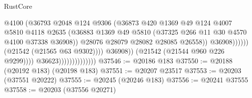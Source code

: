 \begin{lexlean}{RustCore}
\begin{coremodule}
                                                        @4100
                                                        (@36793
                                                          @2048
                                                          @124
                                                          @9306
                                                          (@36873
                                                            @420
                                                            @1369
                                                            @49
                                                            @124
                                                            @4007
                                                            @5810
                                                            @4118
                                                            @2635
                                                            (@36883
                                                              @1369
                                                              @49
                                                              @5810
                                                              (@37325
                                                                @266
                                                                @11
                                                                @30
                                                                @4570
                                                                @4100
                                                                @37338
                                                                @36908))
                                                            @28076
                                                            @28079
                                                            @28082
                                                            @28085
                                                            @26558))
                                                        @36908))))))
                                            (@21542 (@21565 @63 @9302))))
                                        @36908))
                                    (@21542 (@21544 @960 @226 @9299))))
                                @36623))))))))))))))
@37546 := @20186 @183
@37550 := @20188 (@20192 @183) (@20198 @183)
@37551 := @20207 @23517
@37553 := @20203 (@37551 @20222)
@37555 := @20245 (@20246 @183)
@37556 := @20241 @37555
@37558 := @20203 (@37556 @20271)

\end{coremodule}
\end{lexlean}
